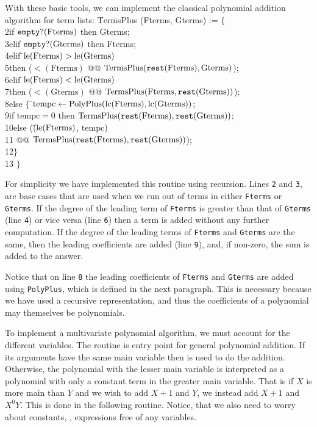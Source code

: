 With these basic tools, we can implement the classical polynomial
addition algorithm for term lists:
\label{TermsPlus:Def}   
 \=Ter\=msPlus (Fterms, Gterms) := $\{$ \\
 2\>\>if $\mathop{\tt empty?}\nolimits(\mbox{Fterms})$ then Gterms; \\
 3\>\>elif $\mathop{\tt empty?}\nolimits(\mbox{Gterms})$ then Fterms; \\
 4\>\>elif \=$\operatorname{le}(\mbox{Fterms}) > \operatorname{le}(\mbox{Gterms})$\\
 5\>\>\>then ($\lt(\mbox{Fterms})$ @@ $\mbox{TermsPlus}(\mathop{\tt rest}\nolimits(\mbox{Fterms}), \mbox{Gterms})$);\\
 6\>\>elif \=$\operatorname{le}(\mbox{Fterms}) < \operatorname{le}(\mbox{Gterms})$\\
 7\>\>\>then ($\lt(\mbox{Gterms})$ @@ $\mbox{TermsPlus}(\mbox{Fterms}, \mathop{\tt rest}\nolimits(\mbox{Gterms}))$);\\
 8\>\>else $\{$ \=$\mbox{tempc} \leftarrow
\mbox{PolyPlus}(\operatorname{lc}(\mbox{Fterms}), \operatorname{lc}(\mbox{Gterms}))$;\\
 9\>\>\>if $\mbox{tempc} = 0$ then $\mbox{TermsPlus}(\mathop{\tt rest}\nolimits(\mbox{Fterms}), \mathop{\tt rest}\nolimits(\mbox{Gterms}))$;\\
10\>\>\>else (\=($\operatorname{le}(\mbox{Fterms})$, $\mbox{tempc}$)\\
11\>\>\>\> @@ $\mbox{TermsPlus}(\mathop{\tt rest}\nolimits(\mbox{Fterms}), \mathop{\tt rest}\nolimits(\mbox{Gterms}))$);\\
12\>\>\>$\}$\\
13\>\> $\}$
\enddsacode

For simplicity we have implemented this routine using recursion.
Lines {\tt 2} and {\tt 3}, are base cases that are used when we run
out of terms in either {\tt Fterms} or {\tt Gterms}.  If the degree of
the leading term of {\tt Fterms} is greater than that of {\tt Gterms}
(line {\tt 4}) or vice versa (line {\tt 6}) then a term is added
without any further computation.  If the degree of the leading terms
of {\tt Fterms} and {\tt Gterms} are the same, then the leading
coefficients are added (line {\tt 9}), and, if non-zero, the sum is added
to the answer.

Notice that on line {\tt 8} the leading coefficients of {\tt Fterms}
and {\tt Gterms} are added using {\tt PolyPlus}, which is defined in
the next paragraph.  This is necessary because we have used a
recursive representation, and thus the coefficients of a polynomial
may themselves be polynomials.

To implement a multivariate polynomial algorithm, we must account for
the different variables.  The routine  is entry
point for general polynomial addition.  If its arguments have the same
main variable then  is used to do the addition.
Otherwise, the polynomial with the lesser main variable is interpreted
as a polynomial with only a constant term in the greater main
variable.  That is if $X$ is more main than $Y$ and we wish to add
$X+1$ and $Y$, we instead add $X+1$ and $X^0 Y$.  This is done in the
following routine.  Notice, that we also need to worry about
constants, \ie, expressions free of any variables.

